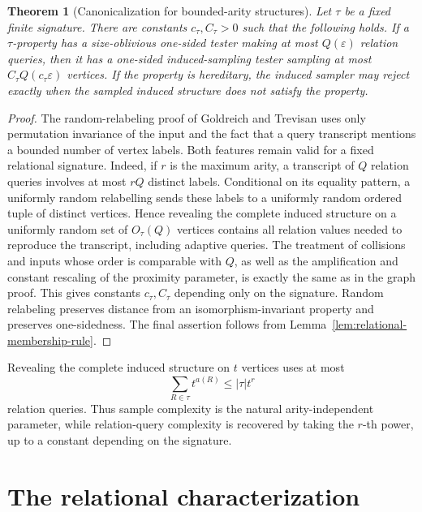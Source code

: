 \documentclass[11pt,reqno,letterpaper]{amsart}
\theoremstyle{plain}
\newtheorem{thm}{Theorem}[section]
\theoremstyle{remark}
\begin{document}
\begin{thm}[Canonicalization for bounded-arity structures]
\label{thm:relational-canonicalization}
Let $\tau$ be a fixed finite signature.  There are constants
$c_\tau,C_\tau>0$ such that the following holds.  If a $\tau$-property has a
size-oblivious one-sided tester making at most $Q(\varepsilon)$ relation
queries, then it has a one-sided induced-sampling tester sampling at most
\(C_\tau Q(c_\tau\varepsilon)\)
vertices.  If the property is hereditary, the induced sampler may reject
exactly when the sampled induced structure does not satisfy the property.
\end{thm}

\begin{proof}
The random-relabeling proof of Goldreich and Trevisan uses only permutation
invariance of the input and the fact that a query transcript mentions a
bounded number of vertex labels.  Both features remain valid for a fixed
relational signature.  Indeed, if $r$ is the maximum arity, a transcript of
$Q$ relation queries involves at most $rQ$ distinct labels.  Conditional on
its equality pattern, a uniformly random relabelling sends these labels to a
uniformly random ordered tuple of distinct vertices.  Hence revealing the
complete induced structure on a uniformly random set of $O_\tau(Q)$ vertices
contains all relation values needed to reproduce the transcript, including
adaptive queries.  The treatment of collisions and inputs whose order is
comparable with $Q$, as well as the amplification and constant rescaling of
the proximity parameter, is exactly the same as in the graph proof.  This
gives constants $c_\tau,C_\tau$ depending only on the signature.  Random
relabeling preserves distance from an isomorphism-invariant property and
preserves one-sidedness.  The final assertion follows from
Lemma~\ref{lem:relational-membership-rule}.
\end{proof}

Revealing the complete induced structure on $t$ vertices uses at most
\begin{equation}
\label{eq:relation-query-cost}
\sum_{R\in\tau}t^{a(R)}\leq |\tau|t^r
\end{equation}
relation queries.  Thus sample complexity is the natural arity-independent
parameter, while relation-query complexity is recovered by taking the
$r$-th power, up to a constant depending on the signature.

\section{The relational characterization}
\label{sec:relational-characterization}
\end{document}
